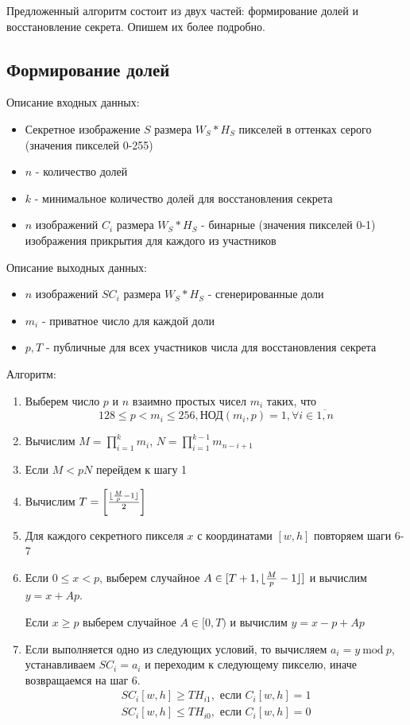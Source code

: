 \documentclass[a4paper,article,14pt]{extarticle}
\newcommand{\Mod}[1]{\ \mathrm{mod}\ #1}
\begin{document}
Предложенный алгоритм состоит из двух частей: формирование долей и восстановление секрета. Опишем их более подробно.

\subsection{Формирование долей}
Описание входных данных:

\begin{itemize}
    \item Секретное изображение $S$ размера $W_S * H_S$ пикселей в оттенках серого (значения пикселей 0-255)
    \item $n$ - количество долей
    \item $k$ - минимальное количество долей для восстановления секрета
    \item $n$ изображений $C_i$ размера $W_S * H_S$ - бинарные (значения пикселей 0-1) изображения прикрытия для каждого из участников
\end{itemize}

Описание выходных данных:

\begin{itemize}
    \item $n$ изображений $SC_i$ размера $W_S * H_S$ - сгенерированные доли
    \item $m_i$ - приватное число для каждой доли
    \item $p, T$ - публичные для всех участников числа для восстановления секрета
\end{itemize}

Алгоритм:
\begin{enumerate}
    \item Выберем число $p$ и $n$ взаимно простых чисел $m_i$ таких, что 
    $$128 \leq p < m_i \leq 256, \text{НОД}(m_i, p)=1, \forall i \in \overline{1,n}$$ 
    \item Вычислим $M=\prod\limits_{i = 1}^k m_i$, $N=\prod\limits_{i = 1}^{k-1} m_{n-i+1}$
    \item Если $M<pN$ перейдем к шагу 1
    \item Вычислим $T=\left[ {{\lfloor{{M}\over{p}}-1\rfloor}\over{2}} \right]$
    \item Для каждого секретного пикселя $x$ с координатами $[w, h]$ повторяем шаги 6-7
    \item Если $0 \leq x < p$, выберем случайное $ A \in [T+1, {\lfloor{{M} \over {p}} - 1\rfloor}]$ и вычислим
    $y = x + Ap$. 
    
    Если $x \geq p$ выберем случайное $ A \in [0, T)$ и вычислим $y = x - p + Ap$
    \item Если выполняется одно из следующих условий, то вычисляем $a_i = y \Mod p$, устанавливаем $SC_i=a_i$ и
    переходим к следующему пикселю, иначе возвращаемся на шаг 6.
    \begin{gather}
        SC_i[w,h] \geq TH_{i1}, \text{ если } C_i[w,h] = 1 \\
        SC_i[w,h] \leq TH_{i0}, \text{ если } C_i[w,h] = 0
    \end{gather}
\end{enumerate}
\end{document}
